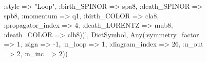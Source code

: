 \documentclass{revtex4}
\begin{document}
\begin{figure}[!htb]
\begin{center}
{:style => "Loop", :birth_SPINOR => spa8, :death_SPINOR => spb8, :momentum => q1, :birth_COLOR => cla8, :propagator_index => 4, :death_LORENTZ => mub8, :death_COLOR => clb8))], Dict{Symbol, Any}(:symmetry_factor => 1, :sign => -1, :n_loop => 1, :diagram_index => 26, :n_out => 2, :n_inc => 2)) 
}
\end{center}
\end{figure}
\end{document}
